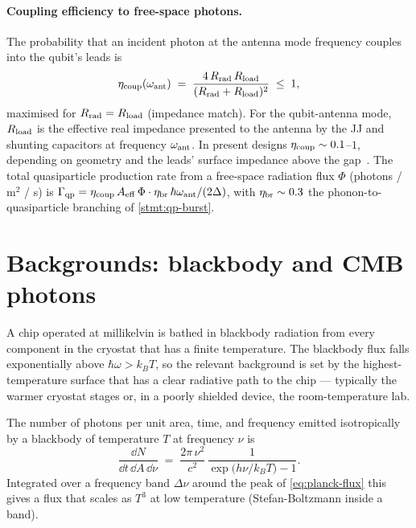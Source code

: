 \paragraph{Coupling efficiency to free-space photons.}
The probability that an incident photon at the antenna mode
frequency couples into the qubit's leads is
\begin{equation}
\label{eq:antenna-eta}
\eta_{\rm coup}(\omega_{\rm ant})
\;=\; \frac{4\,R_{\rm rad}\,R_{\rm load}}{(R_{\rm rad}+R_{\rm load})^2}
\;\leq\; 1,
\end{equation}
maximised for $R_{\rm rad}=R_{\rm load}$ (impedance match). For
the qubit-antenna mode, $R_{\rm load}$ is the effective real
impedance presented to the antenna by the JJ and shunting
capacitors at frequency $\omega_{\rm ant}$. In present designs
$\eta_{\rm coup}\sim 0.1$--$1$, depending on geometry and the
leads' surface impedance above the gap~\cite{liu2024}. The
total quasiparticle production rate from a free-space radiation
flux $\Phi$ (photons / m$^2$ / s) is
$\Gamma_{\rm qp}=\eta_{\rm coup}\,A_{\rm eff}\,\Phi\cdot \eta_{\rm br}\,\hbar\omega_{\rm ant}/(2\Delta)$,
with $\eta_{\rm br}\sim 0.3$ the phonon-to-quasiparticle branching
of \cref{stmt:qp-burst}.

\section{Backgrounds: blackbody and CMB photons}
\label{sec:antenna-backgrounds}

\begin{phenomenon}
A chip operated at millikelvin is bathed in blackbody radiation
from every component in the cryostat that has a finite temperature.
The blackbody flux falls exponentially above $\hbar\omega>k_B T$,
so the relevant background is set by the highest-temperature
surface that has a clear radiative path to the chip --- typically
the warmer cryostat stages or, in a poorly shielded device, the
room-temperature lab.
\end{phenomenon}

\begin{statement}
\label{stmt:planck-flux}
The number of photons per unit area, time, and frequency emitted
isotropically by a blackbody of temperature $T$ at frequency $\nu$
is
\begin{equation}
\label{eq:planck-flux}
\frac{\dd N}{\dd t\,\dd A\,\dd\nu}
\;=\; \frac{2\pi\,\nu^2}{c^2}\,
\frac{1}{\exp\!\bigl(h\nu/k_B T\bigr)-1}.
\end{equation}
Integrated over a frequency band $\Delta\nu$ around the peak of
\cref{eq:planck-flux} this gives a flux that scales as $T^3$ at
low temperature (Stefan-Boltzmann inside a band).
\end{statement}

